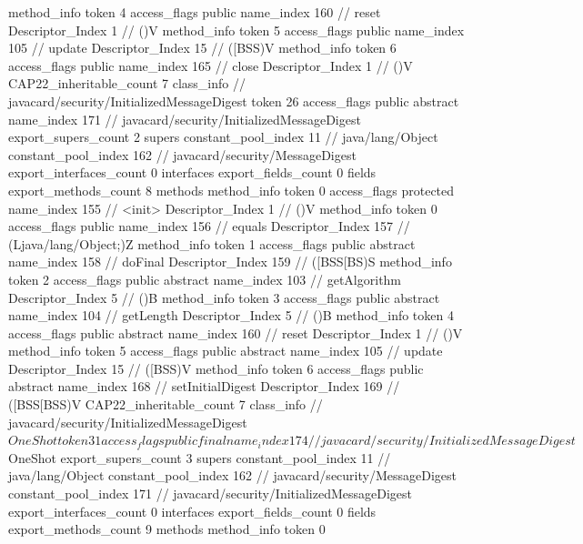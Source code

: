 {{{{{				}
				method_info {
					token	4
					access_flags	public
					name_index	160		// reset
					Descriptor_Index	1		// ()V
				}
				method_info {
					token	5
					access_flags	public
					name_index	105		// update
					Descriptor_Index	15		// ([BSS)V
				}
				method_info {
					token	6
					access_flags	public
					name_index	165		// close
					Descriptor_Index	1		// ()V
				}
			}
			CAP22_inheritable_count	7
		}
		class_info {		// javacard/security/InitializedMessageDigest
			token	26
			access_flags	public abstract
			name_index	171		// javacard/security/InitializedMessageDigest
			export_supers_count	2
			supers {
				constant_pool_index	11		// java/lang/Object
				constant_pool_index	162		// javacard/security/MessageDigest
			}
			export_interfaces_count	0
			interfaces {
			}
			export_fields_count	0
			fields {
			}
			export_methods_count	8
			methods {
				method_info {
					token	0
					access_flags	protected
					name_index	155		// <init>
					Descriptor_Index	1		// ()V
				}
				method_info {
					token	0
					access_flags	public
					name_index	156		// equals
					Descriptor_Index	157		// (Ljava/lang/Object;)Z
				}
				method_info {
					token	1
					access_flags	public abstract
					name_index	158		// doFinal
					Descriptor_Index	159		// ([BSS[BS)S
				}
				method_info {
					token	2
					access_flags	public abstract
					name_index	103		// getAlgorithm
					Descriptor_Index	5		// ()B
				}
				method_info {
					token	3
					access_flags	public abstract
					name_index	104		// getLength
					Descriptor_Index	5		// ()B
				}
				method_info {
					token	4
					access_flags	public abstract
					name_index	160		// reset
					Descriptor_Index	1		// ()V
				}
				method_info {
					token	5
					access_flags	public abstract
					name_index	105		// update
					Descriptor_Index	15		// ([BSS)V
				}
				method_info {
					token	6
					access_flags	public abstract
					name_index	168		// setInitialDigest
					Descriptor_Index	169		// ([BSS[BSS)V
				}
			}
			CAP22_inheritable_count	7
		}
		class_info {		// javacard/security/InitializedMessageDigest$OneShot
			token	31
			access_flags	public final
			name_index	174		// javacard/security/InitializedMessageDigest$OneShot
			export_supers_count	3
			supers {
				constant_pool_index	11		// java/lang/Object
				constant_pool_index	162		// javacard/security/MessageDigest
				constant_pool_index	171		// javacard/security/InitializedMessageDigest
			}
			export_interfaces_count	0
			interfaces {
			}
			export_fields_count	0
			fields {
			}
			export_methods_count	9
			methods {
				method_info {
					token	0
}}}}}
